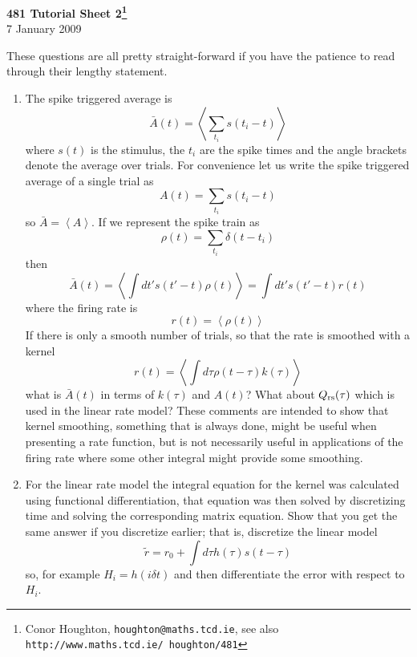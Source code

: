 \documentclass[12pt]{article}
\begin{document}
\begin{center}
{\bf 481 Tutorial Sheet 2\footnote{Conor Houghton, {\tt houghton@maths.tcd.ie}, see also {\tt http://www.maths.tcd.ie/ houghton/481}}}\\[1cm]{} 7 January 2009
\end{center}


These questions are all pretty straight-forward if you have the patience to read through their lengthy statement.

\begin{enumerate}
\item The spike triggered average is
\begin{equation}
\bar{A}(t)=\left<\sum_{t_i}{s(t_i-t)}\right>
\end{equation}
where $s(t)$ is the stimulus, the $t_i$ are the spike times and the angle brackets denote the average over trials. For convenience let us write the spike triggered average of a single trial as
\begin{equation}
A(t)=\sum_{t_i}{s(t_i-t)}
\end{equation}
so $\bar{A}=\left<A\right>$. If we represent the spike train as
\begin{equation}
\rho(t)=\sum_{t_i}{\delta(t-t_i)}
\end{equation}
then 
\begin{equation}
\bar{A}(t)=\left<\int{dt' s(t'-t)\rho(t)}\right>=\int{dt' s(t'-t)r(t)}
\end{equation}
where the firing rate is 
\begin{equation}
r(t)=\left<\rho(t)\right>
\end{equation}
If there is only a smooth number of trials, so that the rate is smoothed with a kernel
\begin{equation}
r(t)=\left<\int d\tau\rho(t-\tau)k(\tau)\right>
\end{equation}
what is $\bar{A}(t)$ in terms of $k(\tau)$ and $A(t)$? What about
$Q_{\mbox{\scriptsize{rs}}}(\tau)$ which is used in the linear rate model? These comments
are intended to show that kernel smoothing, something that is always
done, might be useful when presenting a rate function, but is not
necessarily useful in applications of the firing rate where some other
integral might provide some smoothing.

\item For the linear rate model the integral equation for the kernel
  was calculated using functional differentiation, that equation was
  then solved by discretizing time and solving the corresponding
  matrix equation. Show that you get the same answer if you discretize
  earlier; that is, discretize the linear model
\begin{equation}
\tilde{r}=r_0+\int{d\tau h(\tau) s(t-\tau)}
\end{equation}
so, for example $H_i=h(i\delta t)$ and then differentiate the error with respect to $H_i$.


\end{enumerate}
\end{document}
